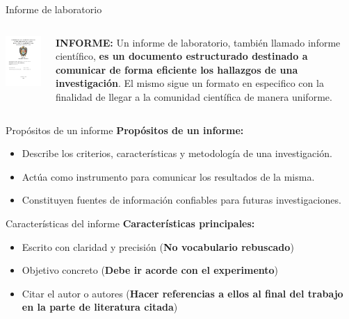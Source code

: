 \documentclass[
11pt, %
]{beamer}
\begin{document}
\begin{frame}{Informe de laboratorio}
	\begin{columns}[c]
		\begin{column}{0.45\textwidth}
			\centering
			\includegraphics[width=6cm]{caratula informe.jpg} %
			\vspace{0.5cm}
		\end{column}
		\begin{column}{0.5\textwidth}
			\textbf{INFORME:} Un informe de laboratorio, también llamado informe científico, \textbf{es un documento estructurado destinado a comunicar de forma eficiente los hallazgos de una investigación}. El mismo sigue un formato en especifico con la finalidad de llegar a la comunidad científica de manera uniforme.
		\end{column}
	\end{columns}
\end{frame}

\begin{frame}{Propósitos de un informe}
	\textbf{Propósitos de un informe:}
	\begin{itemize}
		\item Describe los criterios, características y metodología de una investigación.
		\item Actúa como instrumento para comunicar los resultados de la misma.
		\item Constituyen fuentes de información confiables para futuras investigaciones.
	\end{itemize}
\end{frame}

\begin{frame}{Características del informe}
	\textbf{Características principales:}
	\begin{itemize}
		\item Escrito con claridad y precisión (\textbf{No vocabulario rebuscado})
		\item Objetivo concreto (\textbf{Debe ir acorde con el experimento})
		\item Citar el autor o autores (\textbf{Hacer referencias a ellos al final del trabajo en la parte de literatura citada})
	\end{itemize}
\end{frame}
\end{document}

